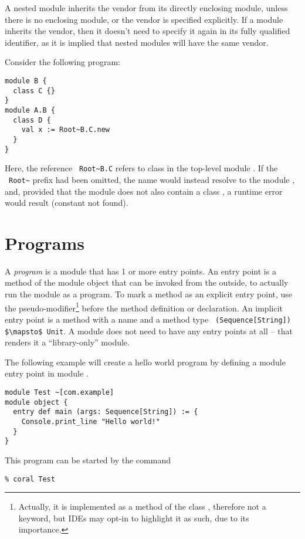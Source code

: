 A nested module inherits the vendor from its directly enclosing module, unless there is no enclosing module, or the vendor is specified explicitly. If a module inherits the vendor, then it doesn't need to specify it again in its fully qualified identifier, as it is implied that nested modules will have the same vendor. 

\example Consider the following program:
\begin{lstlisting}
module B {
  class C {}
}
module A.B {
  class D {
    val x := Root~B.C.new
  }
}
\end{lstlisting}
Here, the reference ~\lstinline!Root~B.C! refers to class  in the top-level module . If the ~\lstinline!Root~! prefix had been omitted, the name  would instead resolve to the module , and, provided that the module does not also contain a class , a runtime error would result (constant not found). 





\section{Programs}
\label{sec:programs}

A {\em program} is a module that has 1 or more entry points. An entry point is a method of the module object that can be invoked from the outside, to actually run the module as a program. To mark a method as an explicit entry point, use the  pseudo-modifier\footnote{Actually, it is implemented as a method of the class , therefore not a keyword, but IDEs may opt-in to highlight it as such, due to its importance.} before the method definition or declaration. An implicit entry point is a method with a name  and a method type ~\lstinline!(Sequence[String]) $\mapsto$ Unit!. A module does not need to have any entry points at all -- that renders it a ``library-only'' module. 

\example The following example will create a hello world program by defining a module entry point in module . 

\syntax\begin{lstlisting}[morekeywords={entry}]
module Test ~[com.example]
module object {
  entry def main (args: Sequence[String]) := {
    Console.print_line "Hello world!"
  }
}
\end{lstlisting}

This program can be started by the command
\begin{lstlisting}
% coral Test
\end{lstlisting}








